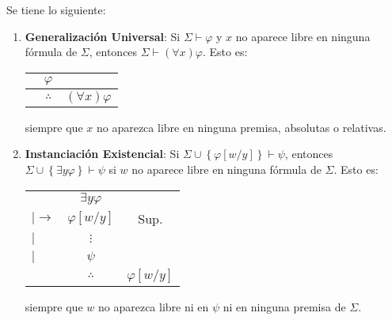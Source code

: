 \documentclass[12pt]{report}
\theoremstyle{largebreak}
\begin{document}
    \begin{theor}
        Se tiene lo siguiente:
        \begin{enumerate}
            \item \textbf{Generalización Universal}: Si $\Sigma\vdash\varphi$ y $x$ no aparece libre en ninguna fórmula de $\Sigma$, entonces $\Sigma\vdash(\forall x)\varphi$. Esto es:
            \begin{center}
                \begin{tabular}{c c c}
                    & $\varphi$  &  \\
                    \hline
                     & $\therefore$ & $(\forall x)\varphi$ \\
                \end{tabular}
            \end{center}
            siempre que $x$ no aparezca libre en ninguna premisa, absolutas o relativas.
            \item \textbf{Instanciación Existencial}: Si $\Sigma\cup\left\{\varphi[w/y]\right\} \vdash\psi$, entonces $\Sigma\cup\left\{\exists y\varphi \right\}\vdash\psi$ si $w$ no aparece libre en ninguna fórmula de $\Sigma$. Esto es:
            \begin{center}
                \begin{tabular}{l c c}
                    & $\exists y\varphi$  &  \\
                   $|\longrightarrow$ & $\varphi[w/y]$  & Sup. \\
                    $|$ & $\vdots$  &  \\
                    $|$ & $\psi$  &  \\
                    \hline
                     & $\therefore$ & $\varphi[w/y]$ \\
                \end{tabular}
            \end{center}
            siempre que $w$ no aparezca libre ni en $\psi$ ni en ninguna premisa de $\Sigma$.
        \end{enumerate}
    \end{theor}
\end{document}
